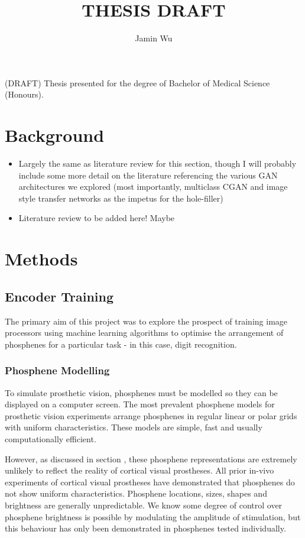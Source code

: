 \documentclass[12pt]{book}
\title{THESIS DRAFT}
\author{Jamin Wu}
\date{}
\begin{document}
\begin{titlepage}
  \begin{center}
    (DRAFT) Thesis presented for the degree of Bachelor of Medical Science (Honours).
  \end{center}
\end{titlepage}

\chapter{Background}

\begin{itemize}
    \item Largely the same as literature review for this section, though I will probably include some more detail on the literature referencing the various GAN architectures we explored (most importantly, multiclass CGAN and image style transfer networks as the impetus for the hole-filler)
    \item Literature review to be added here! Maybe
\end{itemize}

\chapter{Methods}

\section{Encoder Training}

The primary aim of this project was to explore the prospect of training image processors using machine learning algorithms to optimise the arrangement of phosphenes for a particular task - in this case, digit recognition.

\subsection{Phosphene Modelling}

To simulate prosthetic vision, phosphenes must be modelled so they can be displayed on a computer screen. The most prevalent phosphene models for prosthetic vision experiments arrange phosphenes in regular linear or polar grids with uniform characteristics. These models are simple, fast and usually computationally efficient.

However, as discussed in section {}, these phosphene representations are extremely unlikely to reflect the reality of cortical visual prostheses. All prior in-vivo experiments of cortical visual prostheses have demonstrated that phosphenes do not show uniform characteristics. Phosphene locations, sizes, shapes and brightness are generally unpredictable. We know some degree of control over phosphene brightness is possible by modulating the amplitude of stimulation, but this behaviour has only been demonstrated in phosphenes tested individually.
\end{document}
